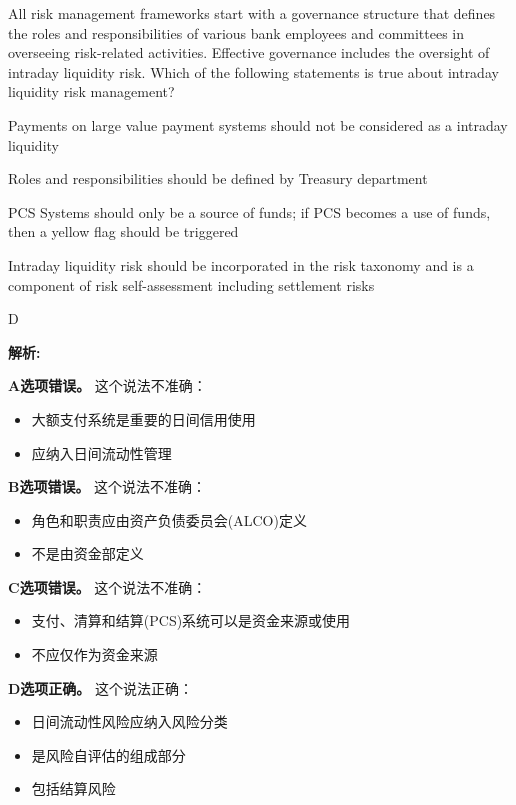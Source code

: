 \documentclass{article}
\newcounter{question} %
\newenvironment{explanation}
{\textbf{解析:}\par}
{\par}
\begin{document}
\begin{question}
    All risk management frameworks start with a governance structure that defines the roles and responsibilities of various bank employees and committees in overseeing risk-related activities. Effective governance includes the oversight of intraday liquidity risk. Which of the following statements is true about intraday liquidity risk management?
\end{question}

\begin{choices}
    \item Payments on large value payment systems should not be considered as a intraday liquidity
    \item Roles and responsibilities should be defined by Treasury department
    \item PCS Systems should only be a source of funds; if PCS becomes a use of funds, then a yellow flag should be triggered
    \item Intraday liquidity risk should be incorporated in the risk taxonomy and is a component of risk self-assessment including settlement risks
\end{choices}

\begin{correctanswer}
    D
\end{correctanswer}

\begin{explanation}
    \textbf{A选项错误。}
    这个说法不准确：
    \begin{itemize}
        \item 大额支付系统是重要的日间信用使用
        \item 应纳入日间流动性管理
    \end{itemize}

    \textbf{B选项错误。}
    这个说法不准确：
    \begin{itemize}
        \item 角色和职责应由资产负债委员会(ALCO)定义
        \item 不是由资金部定义
    \end{itemize}

    \textbf{C选项错误。}
    这个说法不准确：
    \begin{itemize}
        \item 支付、清算和结算(PCS)系统可以是资金来源或使用
        \item 不应仅作为资金来源
    \end{itemize}

    \textbf{D选项正确。}
    这个说法正确：
    \begin{itemize}
        \item 日间流动性风险应纳入风险分类
        \item 是风险自评估的组成部分
        \item 包括结算风险
    \end{itemize}
\end{explanation}
\end{document}
